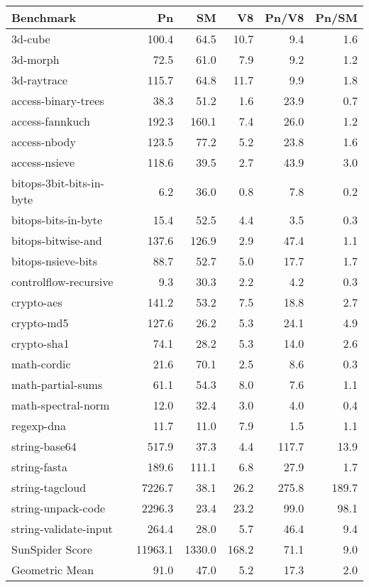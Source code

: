 \begin{tabular}{|l|r|r|r|r|r|}
  \hline
  Benchmark & Pn & SM & V8 & Pn/V8 & Pn/SM \\
  \hline \hline
  3d-cube & 100.4 & 64.5 & 10.7 & 9.4 & 1.6\\
  \hline
  3d-morph & 72.5 & 61.0 & 7.9 & 9.2 & 1.2\\
  \hline
  3d-raytrace & 115.7 & 64.8 & 11.7 & 9.9 & 1.8\\
  \hline
  access-binary-trees & 38.3 & 51.2 & 1.6 & 23.9 & 0.7\\
  \hline
  access-fannkuch & 192.3 & 160.1 & 7.4 & 26.0 & 1.2\\
  \hline
  access-nbody & 123.5 & 77.2 & 5.2 & 23.8 & 1.6\\
  \hline
  access-nsieve & 118.6 & 39.5 & 2.7 & 43.9 & 3.0\\
  \hline
  bitops-3bit-bits-in-byte & 6.2 & 36.0 & 0.8 & 7.8 & 0.2\\
  \hline
  bitops-bits-in-byte & 15.4 & 52.5 & 4.4 & 3.5 & 0.3\\
  \hline
  bitops-bitwise-and & 137.6 & 126.9 & 2.9 & 47.4 & 1.1\\
  \hline
  bitops-nsieve-bits & 88.7 & 52.7 & 5.0 & 17.7 & 1.7\\
  \hline
  controlflow-recursive & 9.3 & 30.3 & 2.2 & 4.2 & 0.3\\
  \hline
  crypto-aes & 141.2 & 53.2 & 7.5 & 18.8 & 2.7\\
  \hline
  crypto-md5 & 127.6 & 26.2 & 5.3 & 24.1 & 4.9\\
  \hline
  crypto-sha1 & 74.1 & 28.2 & 5.3 & 14.0 & 2.6\\
  \hline
  math-cordic & 21.6 & 70.1 & 2.5 & 8.6 & 0.3\\
  \hline
  math-partial-sums & 61.1 & 54.3 & 8.0 & 7.6 & 1.1\\
  \hline
  math-spectral-norm & 12.0 & 32.4 & 3.0 & 4.0 & 0.4\\
  \hline
  regexp-dna & 11.7 & 11.0 & 7.9 & 1.5 & 1.1\\
  \hline
  string-base64 & 517.9 & 37.3 & 4.4 & 117.7 & 13.9\\
  \hline
  string-fasta & 189.6 & 111.1 & 6.8 & 27.9 & 1.7\\
  \hline
  string-tagcloud & 7226.7 & 38.1 & 26.2 & 275.8 & 189.7\\
  \hline
  string-unpack-code & 2296.3 & 23.4 & 23.2 & 99.0 & 98.1\\
  \hline
  string-validate-input & 264.4 & 28.0 & 5.7 & 46.4 & 9.4\\
  \hline
  \hline
  SunSpider Score & 11963.1 & 1330.0 & 168.2 & 71.1 & 9.0\\
  Geometric Mean & 91.0 & 47.0 & 5.2 & 17.3 & 2.0\\
  \hline
\end{tabular}
